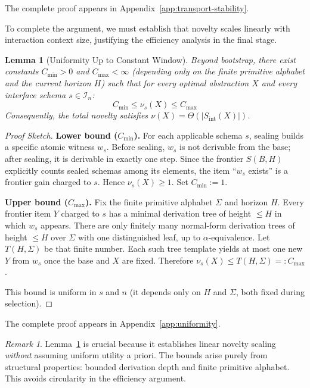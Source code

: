 \documentclass[11pt]{article}
\newtheorem{lemma}[theorem]{Lemma}
\theoremstyle{definition}
\theoremstyle{remark}
\newtheorem{remark}[theorem]{Remark}
\begin{document}
The complete proof appears in Appendix~\ref{app:transport-stability}.

To complete the argument, we must establish that novelty scales linearly with interaction context
size, justifying the efficiency analysis in the final stage.

\begin{lemma}[Uniformity Up to Constant Window]
\label{lem:uniformity}
Beyond bootstrap, there exist constants $C_{\min} > 0$ and $C_{\max} < \infty$ (depending only on the
finite primitive alphabet and the current horizon $H$) such that for every optimal abstraction $X$
and every interface schema $s \in \mathcal{I}_n$:
\[
C_{\min} \leq \nu_s(X) \leq C_{\max}
\]
Consequently, the total novelty satisfies $\nu(X) = \Theta(|S_{\text{int}}(X)|)$.
\end{lemma}

\begin{proof}[Proof Sketch]
\textbf{Lower bound ($C_{\min}$).} For each applicable schema $s$, sealing builds a specific atomic
witness $w_s$. Before sealing, $w_s$ is not derivable from the base; after sealing, it is derivable in
exactly one step. Since the frontier $S(B,H)$ explicitly counts sealed schemas among its elements,
the item ``$w_s$ exists'' is a frontier gain charged to $s$. Hence $\nu_s(X) \geq 1$. Set $C_{\min} := 1$.

\textbf{Upper bound ($C_{\max}$).} Fix the finite primitive alphabet $\Sigma$ and horizon $H$. Every
frontier item $Y$ charged to $s$ has a minimal derivation tree of height $\leq H$ in which $w_s$ appears.
There are only finitely many normal-form derivation trees of height $\leq H$ over $\Sigma$ with one
distinguished leaf, up to $\alpha$-equivalence. Let $T(H,\Sigma)$ be that finite number. Each such tree
template yields at most one new $Y$ from $w_s$ once the base and $X$ are fixed. Therefore
$\nu_s(X) \leq T(H,\Sigma) =: C_{\max}$.

This bound is uniform in $s$ and $n$ (it depends only on $H$ and $\Sigma$, both fixed during selection).
\end{proof}

The complete proof appears in Appendix~\ref{app:uniformity}.

\begin{remark}
Lemma~\ref{lem:uniformity} is crucial because it establishes linear novelty scaling \emph{without}
assuming uniform utility a priori. The bounds arise purely from structural properties: bounded
derivation depth and finite primitive alphabet. This avoids circularity in the efficiency argument.
\end{remark}
\end{document}
